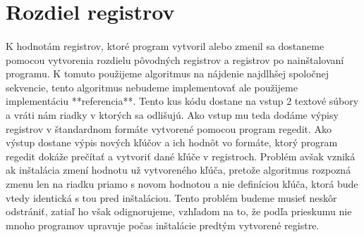 \section{Rozdiel registrov}
\paragraph{}
K hodnotám registrov, ktoré program vytvoril alebo zmenil sa dostaneme pomocou vytvorenia rozdielu pôvodných registrov a registrov po nainštalovaní programu. K tomuto použijeme algoritmus na nájdenie najdlhšej spoločnej sekvencie, tento algoritmus nebudeme implementovať ale použijeme implementáciu **referencia**. Tento kus kódu dostane na vstup 2 textové súbory a vráti nám riadky v ktorých sa odlišujú. Ako vstup mu teda dodáme výpisy registrov v štandardnom formáte vytvorené pomocou program regedit. Ako výstup dostane výpis nových kľúčov a ich hodnôt vo formáte, ktorý program regedit dokáže prečítať a vytvoriť dané kľúče v registroch. Problém avšak vzniká ak inštalácia zmení hodnotu už vytvoreného kľúča, pretože algoritmus rozpozná zmenu len na riadku priamo s novom hodnotou a nie definíciou kľúča, ktorá bude vtedy identická s tou pred inštaláciou. Tento problém budeme musieť neskôr odstrániť, zatiaľ ho však odignorujeme, vzhľadom na to, že podľa prieskumu nie mnoho programov upravuje počas inštalácie predtým vytvorené registre.